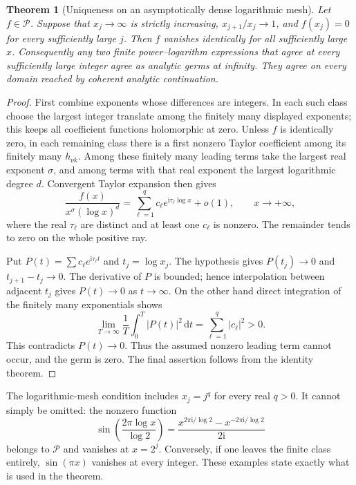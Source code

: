 \documentclass[11pt]{article}
\numberwithin{equation}{section}
\theoremstyle{plain}
\newtheorem{theorem}{Theorem}[section]
\theoremstyle{definition}
\theoremstyle{remark}
\newcommand{\ii}{\mathrm i}
\newcommand{\dd}{\,\mathrm d}
\begin{document}
\begin{theorem}[Uniqueness on an asymptotically dense logarithmic mesh]
\label{sampling:unique}
Let $f\in\mathscr P$. Suppose that $x_j\to\infty$ is strictly
increasing, $x_{j+1}/x_j\to1$, and $f(x_j)=0$ for every sufficiently
large $j$. Then $f$ vanishes identically for all sufficiently large $x$.
Consequently any two finite power--logarithm expressions that agree at
every sufficiently large integer agree as analytic germs at infinity.
They agree on every domain reached by coherent analytic continuation.
\end{theorem}
\begin{proof}
First combine exponents whose differences are integers. In each such
class choose the largest integer translate among the finitely many
displayed exponents; this keeps all coefficient functions holomorphic
at zero. Unless $f$ is identically zero, in each remaining class there
is a first nonzero Taylor coefficient among its finitely many
$h_{\nu k}$. Among these finitely many leading terms take the largest
real exponent $\sigma$, and among terms with that real exponent the
largest logarithmic degree $d$. Convergent Taylor expansion then gives
\begin{equation}\label{sampling:leading}
 \frac{f(x)}{x^\sigma(\log x)^d}
   =\sum_{\ell=1}^q c_\ell e^{\ii\tau_\ell\log x}+o(1),
 \qquad x\to+\infty,
\end{equation}
where the real $\tau_\ell$ are distinct and at least one $c_\ell$ is
nonzero. The remainder tends to zero on the whole positive ray.

Put $P(t)=\sum c_\ell e^{\ii\tau_\ell t}$ and $t_j=\log x_j$.
The hypothesis gives $P(t_j)\to0$ and $t_{j+1}-t_j\to0$.
The derivative of $P$ is bounded; hence interpolation between adjacent
$t_j$ gives $P(t)\to0$ as $t\to\infty$. On the other hand direct
integration of the finitely many exponentials shows
\[
 \lim_{T\to\infty}\frac1T\int_0^T|P(t)|^2\dd t
       =\sum_{\ell=1}^q|c_\ell|^2>0.
\]
This contradicts $P(t)\to0$. Thus the assumed nonzero leading term
cannot occur, and the germ is zero. The final assertion follows from
the identity theorem.
\end{proof}

The logarithmic-mesh condition includes $x_j=j^q$ for every real $q>0$.
It cannot simply be omitted: the nonzero function
\[
 \sin\left(\frac{2\pi\log x}{\log 2}\right)
 =\frac{x^{2\pi\ii/\log2}-x^{-2\pi\ii/\log2}}{2\ii}
\]
belongs to $\mathscr P$ and vanishes at $x=2^j$. Conversely, if
one leaves the finite class entirely, $\sin(\pi x)$ vanishes at every
integer. These examples state exactly what is used in the theorem.
\end{document}
